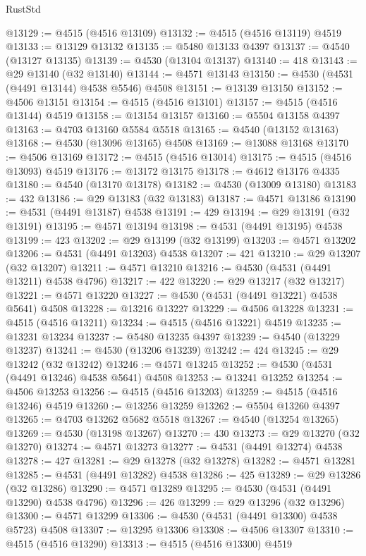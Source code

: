 \begin{lexlean}{RustStd}
\begin{coremodule}
{\begin{coremodule}
{{{{{{{{{{{{{{{{{{{{{{{{{{{{{{{{{{{{{{{{{{{{{{{{{{{{{{{@13129 := @4515 (@4516 @13109)
@13132 := @4515 (@4516 @13119) @4519
@13133 := @13129 @13132
@13135 := @5480 @13133 @4397
@13137 := @4540 (@13127 @13135)
@13139 := @4530 (@13104 @13137)
@13140 := 418
@13143 := @29 @13140 (@32 @13140)
@13144 := @4571 @13143
@13150 := @4530 (@4531 (@4491 @13144) @4538 @5546) @4508
@13151 := @13139 @13150
@13152 := @4506 @13151
@13154 := @4515 (@4516 @13101)
@13157 := @4515 (@4516 @13144) @4519
@13158 := @13154 @13157
@13160 := @5504 @13158 @4397
@13163 := @4703 @13160 @5584 @5518
@13165 := @4540 (@13152 @13163)
@13168 := @4530 (@13096 @13165) @4508
@13169 := @13088 @13168
@13170 := @4506 @13169
@13172 := @4515 (@4516 @13014)
@13175 := @4515 (@4516 @13093) @4519
@13176 := @13172 @13175
@13178 := @4612 @13176 @4335
@13180 := @4540 (@13170 @13178)
@13182 := @4530 (@13009 @13180)
@13183 := 432
@13186 := @29 @13183 (@32 @13183)
@13187 := @4571 @13186
@13190 := @4531 (@4491 @13187) @4538
@13191 := 429
@13194 := @29 @13191 (@32 @13191)
@13195 := @4571 @13194
@13198 := @4531 (@4491 @13195) @4538
@13199 := 423
@13202 := @29 @13199 (@32 @13199)
@13203 := @4571 @13202
@13206 := @4531 (@4491 @13203) @4538
@13207 := 421
@13210 := @29 @13207 (@32 @13207)
@13211 := @4571 @13210
@13216 := @4530 (@4531 (@4491 @13211) @4538 @4796)
@13217 := 422
@13220 := @29 @13217 (@32 @13217)
@13221 := @4571 @13220
@13227 := @4530 (@4531 (@4491 @13221) @4538 @5641) @4508
@13228 := @13216 @13227
@13229 := @4506 @13228
@13231 := @4515 (@4516 @13211)
@13234 := @4515 (@4516 @13221) @4519
@13235 := @13231 @13234
@13237 := @5480 @13235 @4397
@13239 := @4540 (@13229 @13237)
@13241 := @4530 (@13206 @13239)
@13242 := 424
@13245 := @29 @13242 (@32 @13242)
@13246 := @4571 @13245
@13252 := @4530 (@4531 (@4491 @13246) @4538 @5641) @4508
@13253 := @13241 @13252
@13254 := @4506 @13253
@13256 := @4515 (@4516 @13203)
@13259 := @4515 (@4516 @13246) @4519
@13260 := @13256 @13259
@13262 := @5504 @13260 @4397
@13265 := @4703 @13262 @5682 @5518
@13267 := @4540 (@13254 @13265)
@13269 := @4530 (@13198 @13267)
@13270 := 430
@13273 := @29 @13270 (@32 @13270)
@13274 := @4571 @13273
@13277 := @4531 (@4491 @13274) @4538
@13278 := 427
@13281 := @29 @13278 (@32 @13278)
@13282 := @4571 @13281
@13285 := @4531 (@4491 @13282) @4538
@13286 := 425
@13289 := @29 @13286 (@32 @13286)
@13290 := @4571 @13289
@13295 := @4530 (@4531 (@4491 @13290) @4538 @4796)
@13296 := 426
@13299 := @29 @13296 (@32 @13296)
@13300 := @4571 @13299
@13306 := @4530 (@4531 (@4491 @13300) @4538 @5723) @4508
@13307 := @13295 @13306
@13308 := @4506 @13307
@13310 := @4515 (@4516 @13290)
@13313 := @4515 (@4516 @13300) @4519
}}}}}}}}}}}}}}}}}}}}}}}}}}}}}}}}}}}}}}}}}}}}}}}}}}}}}}}
\end{coremodule}}
\end{coremodule}
\end{lexlean}
